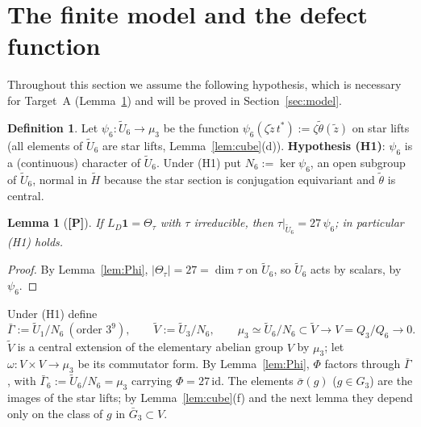 \documentclass[11pt]{article}
\newcommand{\tH}{\widetilde H}
\newcommand{\tU}{\widetilde U}
\newcommand{\tV}{\widetilde V}
\newcommand{\tth}{\widetilde\theta}
\newcommand{\Ptag}{\textnormal{\textbf{[P]}}}
\theoremstyle{plain}
\newtheorem{lemma}[theorem]{Lemma}
\theoremstyle{definition}
\newtheorem{definition}[theorem]{Definition}
\begin{document}
\section{The finite model and the defect function}\label{sec:finite}
Throughout this section we assume the following hypothesis, which is
necessary for Target~A (Lemma~\ref{lem:H1necessary}) and will be
proved in Section~\ref{sec:model}.

\begin{definition}\label{def:psi6}
Let $\psi_6:\tU_6\to\mu_3$ be the function
$\psi_6(\zeta\tilde z\,t^*):=\zeta\tth(\tilde z)$ on star lifts (all
elements of $\tU_6$ are star lifts, Lemma~\ref{lem:cube}(d)).
\textbf{Hypothesis (H1)}: $\psi_6$ is a (continuous) character of
$\tU_6$.  Under (H1) put $N_6:=\ker\psi_6$, an open subgroup of
$\tU_6$, normal in $\tH$ because the star section is conjugation
equivariant and $\tth$ is central.
\end{definition}

\begin{lemma}[\Ptag]\label{lem:H1necessary}
If $L_D\mathbf1=\Theta_\tau$ with $\tau$ irreducible, then $\tau|_{\tU_6}=27\,\psi_6$;
in particular (H1) holds.
\end{lemma}
\begin{proof}
By Lemma~\ref{lem:Phi}, $|\Theta_\tau|=27=\dim\tau$ on $\tU_6$, so $\tU_6$
acts by scalars, by $\psi_6$.
\end{proof}

Under (H1) define
\[
 \bar\Gamma:=\tU_1/N_6\ (\text{order }3^9),\qquad
 \tV:=\tU_3/N_6,\qquad
 \mu_3\simeq\tU_6/N_6\subset\tV\to V=Q_3/Q_6\to0 .
\]
$\tV$ is a central extension of the elementary abelian group $V$ by
$\mu_3$; let $\omega:V\times V\to\mu_3$ be its commutator form.  By
Lemma~\ref{lem:Phi}, $\Phi$ factors through $\bar\Gamma$, with
$\bar\Gamma_6:=\tU_6/N_6=\mu_3$ carrying $\Phi=27\,\mathrm{id}$.  The
elements $\bar\sigma(g)$ ($g\in G_3$) are the images of the star lifts;
by Lemma~\ref{lem:cube}(f) and the next lemma they depend only on the
class of $g$ in $\bar G_3\subset V$.
\end{document}
